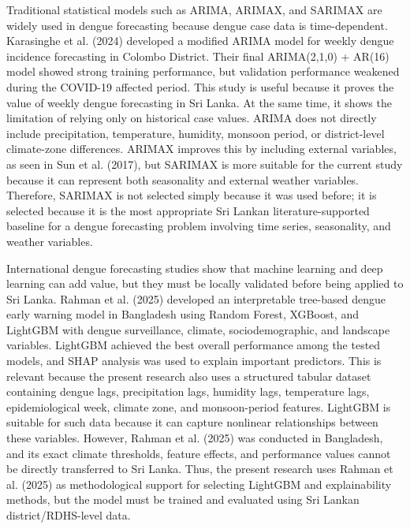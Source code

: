 \documentclass[12pt,a4paper]{article}
\begin{document}
Traditional statistical models such as ARIMA, ARIMAX, and SARIMAX are widely used in dengue forecasting because dengue case data is time-dependent. Karasinghe et al. (2024) developed a modified ARIMA model for weekly dengue incidence forecasting in Colombo District. Their final ARIMA(2,1,0) + AR(16) model showed strong training performance, but validation performance weakened during the COVID-19 affected period. This study is useful because it proves the value of weekly dengue forecasting in Sri Lanka. At the same time, it shows the limitation of relying only on historical case values. ARIMA does not directly include precipitation, temperature, humidity, monsoon period, or district-level climate-zone differences. ARIMAX improves this by including external variables, as seen in Sun et al. (2017), but SARIMAX is more suitable for the current study because it can represent both seasonality and external weather variables. Therefore, SARIMAX is not selected simply because it was used before; it is selected because it is the most appropriate Sri Lankan literature-supported baseline for a dengue forecasting problem involving time series, seasonality, and weather variables.

International dengue forecasting studies show that machine learning and deep learning can add value, but they must be locally validated before being applied to Sri Lanka. Rahman et al. (2025) developed an interpretable tree-based dengue early warning model in Bangladesh using Random Forest, XGBoost, and LightGBM with dengue surveillance, climate, sociodemographic, and landscape variables. LightGBM achieved the best overall performance among the tested models, and SHAP analysis was used to explain important predictors. This is relevant because the present research also uses a structured tabular dataset containing dengue lags, precipitation lags, humidity lags, temperature lags, epidemiological week, climate zone, and monsoon-period features. LightGBM is suitable for such data because it can capture nonlinear relationships between these variables. However, Rahman et al. (2025) was conducted in Bangladesh, and its exact climate thresholds, feature effects, and performance values cannot be directly transferred to Sri Lanka. Thus, the present research uses Rahman et al. (2025) as methodological support for selecting LightGBM and explainability methods, but the model must be trained and evaluated using Sri Lankan district/RDHS-level data.
\end{document}
